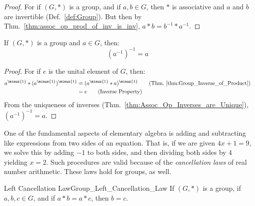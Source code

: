     \begin{proof}
        For if $(G,*)$ is a group, and if $a,b\in{G}$, then $*$ is associative
        and $a$ and $b$ are invertible (Def.~\ref{def:Group}). But then by
        Thm.~\ref{thm:assoc_op_prod_of_inv_is_inv},
        $a*b=b^{\minus{1}}*a^{\minus{1}}$.
    \end{proof}
    \begin{theorem}
        \label{thm:Group_Inverse_of_Inverse}%
        If $(G,*)$ is a group and $a\in{G}$, then:
        \begin{equation}
            (a^{\minus{1}})^{\minus{1}}=a
        \end{equation}
    \end{theorem}
    \begin{proof}
        For if $e$ is the unital element of $G$, then:
        \begin{align}
            a^{\minus{1}}*(a^{\minus{1}})^{\minus{1}}
            &=(a^{\minus{1}}* a)^{\minus{1}}
            \tag{Thm.~\ref{thm:Group_Inverse_of_Product}}\\
            &=e
            \tag{Inverse Property}
        \end{align}
        From the uniqueness of inverses
        (Thm.~\ref{thm:Assoc_Op_Inverses_are_Unique}),
        $(a^{\minus{1}})^{\minus{1}}=a$.
    \end{proof}
    One of the fundamental aspects of elementary algebra is adding and
    subtracting like expressions from two sides of an equation. That is, if we
    are given $4x+1=9$, we solve this by adding $\minus{1}$ to both sides, and
    then dividing both sides by $4$ yielding $x=2$. Such procedures are valid
    because of the \textit{cancellation laws} of real
    number arithmetic. These laws hold for groups, as well.
    \begin{ltheorem}{Left Cancellation Law}{Group_Left_Cancellation_Law}
        If $(G,*)$ is a group, if $a,b,c\in{G}$, and if $a*b=a*c$, then $b=c$.
    \end{ltheorem}
